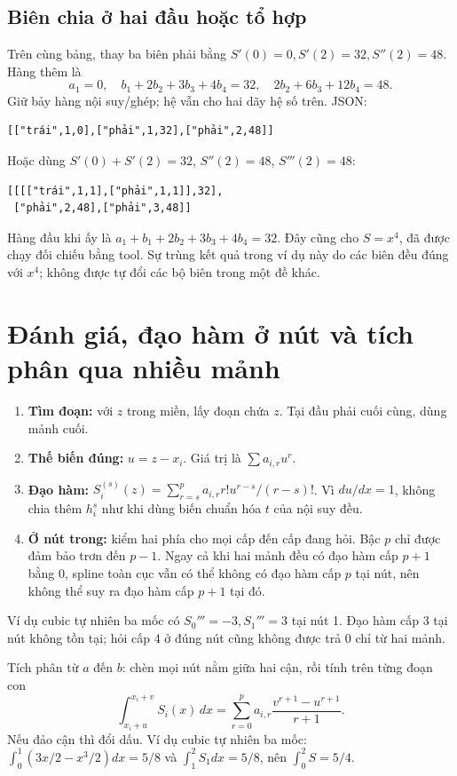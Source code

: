 \subsection{Biên chia ở hai đầu hoặc tổ hợp}
\label{sec:spline-quartic-mixed}
Trên cùng bảng, thay ba biên phải bằng
$S'(0)=0,S'(2)=32,S''(2)=48$. Hàng thêm là
\[
a_1=0,\quad b_1+2b_2+3b_3+4b_4=32,\quad
2b_2+6b_3+12b_4=48.
\]
Giữ bảy hàng nội suy/ghép; hệ vẫn cho hai dãy hệ số trên. JSON:
\begin{verbatim}
[["trái",1,0],["phải",1,32],["phải",2,48]]
\end{verbatim}
Hoặc dùng $S'(0)+S'(2)=32$, $S''(2)=48$, $S'''(2)=48$:
\begin{verbatim}
[[[["trái",1,1],["phải",1,1]],32],
 ["phải",2,48],["phải",3,48]]
\end{verbatim}
Hàng đầu khi ấy là $a_1+b_1+2b_2+3b_3+4b_4=32$.
Đây cũng cho $S=x^4$, đã được chạy đối chiếu bằng tool.
Sự trùng kết quả trong ví dụ này do các biên đều đúng với $x^4$; không được tự đổi các bộ biên trong một đề khác.

\section{Đánh giá, đạo hàm ở nút và tích phân qua nhiều mảnh}
\label{sec:spline-evaluation}
\begin{enumerate}
\item \textbf{Tìm đoạn:} với $z$ trong miền, lấy đoạn chứa $z$. Tại đầu phải cuối cùng, dùng mảnh cuối.
\item \textbf{Thế biến đúng:} $u=z-x_i$. Giá trị là $\sum a_{i,r}u^r$.
\item \textbf{Đạo hàm:} $S_i^{(s)}(z)=\sum_{r=s}^p a_{i,r}r!u^{r-s}/(r-s)!$.
Vì $du/dx=1$, không chia thêm $h_i^s$ như khi dùng biến chuẩn hóa $t$ của nội suy đều.
\item \textbf{Ở nút trong:} kiểm hai phía cho mọi cấp đến cấp đang hỏi. Bậc $p$ chỉ được đảm bảo trơn đến $p-1$.
Ngay cả khi hai mảnh đều có đạo hàm cấp $p+1$ bằng 0, spline toàn cục vẫn có thể không có đạo hàm cấp $p$ tại nút, nên không thể suy ra đạo hàm cấp $p+1$ tại đó.
\end{enumerate}
Ví dụ cubic tự nhiên ba mốc có $S_0'''=-3,S_1'''=3$ tại nút 1.
Đạo hàm cấp 3 tại nút không tồn tại; hỏi cấp 4 ở đúng nút cũng không được trả 0 chỉ từ hai mảnh.

Tích phân từ $a$ đến $b$: chèn mọi nút nằm giữa hai cận, rồi tính trên từng đoạn con
\[
\int_{x_i+u}^{x_i+v}S_i(x)\,dx
=\sum_{r=0}^p a_{i,r}\frac{v^{r+1}-u^{r+1}}{r+1}.
\]
Nếu đảo cận thì đổi dấu. Ví dụ cubic tự nhiên ba mốc:
$\int_0^1(3x/2-x^3/2)dx=5/8$ và $\int_1^2S_1dx=5/8$,
nên $\int_0^2S=5/4$.

